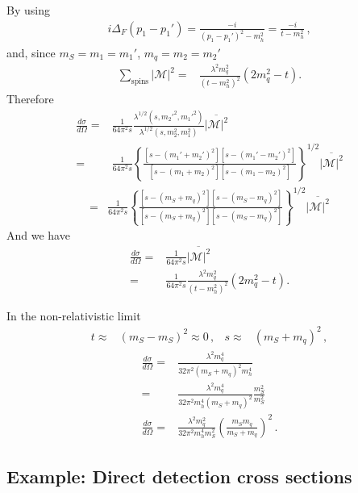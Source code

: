 By using
\begin{align}
  i\Delta_F( p_1-p_1')=\frac{-i}{(p_1-p_1')^2-m_h^2}
  =\frac{-i}{t-m_h^2}\,,
\end{align}
and, since $m_S=m_1=m_1'$, $m_q=m_2=m_2'$
\begin{align}
   \sum_{\text{spins}} |\mathcal{M}|^2=&\frac{\lambda^2 m_q^2}{\left( t-m_h^2 \right)^2} \left(2m_q^2-t\right).
\end{align}
Therefore
\begin{align}
     \frac{d\sigma}{d\Omega}=&\frac{1}{64\pi^2s}
\frac{\lambda^{1/2}(s,{m_2'}^2,{m_1'}^2)}{\lambda^{1/2}(s,m_2^2,m_1^2)}
                               \overline{|\mathcal{M}|^2} \nonumber\\
=&\frac{1}{64\pi^2s}\left\{
\frac{[s-(m_1'+m_2')^2][s-(m_1'-m_2')^2]}{[s-(m_1+m_2)^2][s-(m_1-m_2)^2]}\right\}^{1/2}
\overline{|\mathcal{M}|^2}  
\end{align}
\begin{align}
  =&\frac{1}{64\pi^2s}\left\{
\frac{[s-(m_S+m_q)^2][s-(m_S-m_q)^2]}{[s-(m_S+m_q)^2][s-(m_S-m_q)^2]}\right\}^{1/2}
\overline{|\mathcal{M}|^2}  
\end{align}
And we have 
\begin{align}
\frac{d\sigma}{d\Omega}  =&\frac{1}{64\pi^2s}\overline{|\mathcal{M}|^2} \nonumber\\
  =&\frac{1}{64\pi^2s}\frac{\lambda^2 m_q^2}{\left( t-m_h^2 \right)^2}
     \left(2m_q^2-t\right).
\end{align}

In the non-relativistic limit
\begin{align}
  t\approx& (m_S-m_S)^2\approx 0\,,& 
  s\approx& (m_S+m_q)^2\,,
\end{align}
\begin{align}
   \frac{d\sigma}{d\Omega}=& \frac{\lambda^2 m_q^4}{32\pi^2 \left(m_S+m_q\right)^2m_h^4}\nonumber\\
  =&
     \frac{\lambda^2 m_q^4}{32\pi^2 m_h^4\left(m_S+m_q\right)^2}
     \frac{m_S^2}{m_S^2}\nonumber\\
       \frac{d\sigma}{d\Omega}
                    =&\frac{\lambda^2m_q^2}{32\pi^2m_h^4m_S^2}\left( \frac{m_Sm_q}{m_S+m_q} \right)^2\,.
\end{align}

\subsection{Example: Direct detection cross sections}

